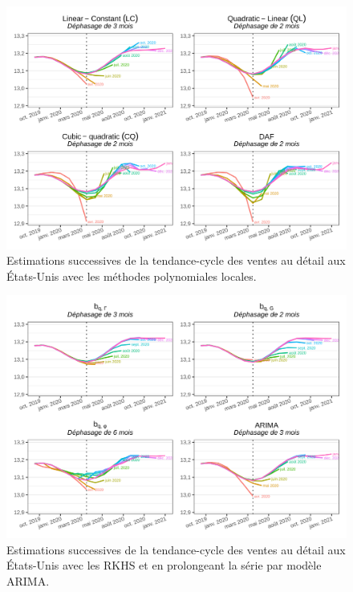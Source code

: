 \documentclass[
  12pt,
  french,
  12pt,a4paper]{article}
\newcommand\1{\mathds{1}}
\begin{document}
\begin{figure}

{\centering \includegraphics[width=0.9\linewidth]{img/nber/retailx_lp} 

}

\caption[Estimations successives de la tendance-cycle des ventes au détail aux États-Unis avec les méthodes polynomiales locales]{Estimations successives de la tendance-cycle des ventes au détail aux États-Unis avec les méthodes polynomiales locales.}\label{fig:retailxlp}

\footnotesize
\normalsize\end{figure}

\begin{figure}

{\centering \includegraphics[width=0.9\linewidth]{img/nber/retailx_rkhs_arima} 

}

\caption[Estimations successives de la tendance-cycle des ventes au détail aux États-Unis avec les RKHS et en prolongeant la série par modèle ARIMA]{Estimations successives de la tendance-cycle des ventes au détail aux États-Unis avec les RKHS et en prolongeant la série par modèle ARIMA.}\label{fig:retailxrkhs}

\footnotesize
\normalsize\end{figure}
\end{document}
